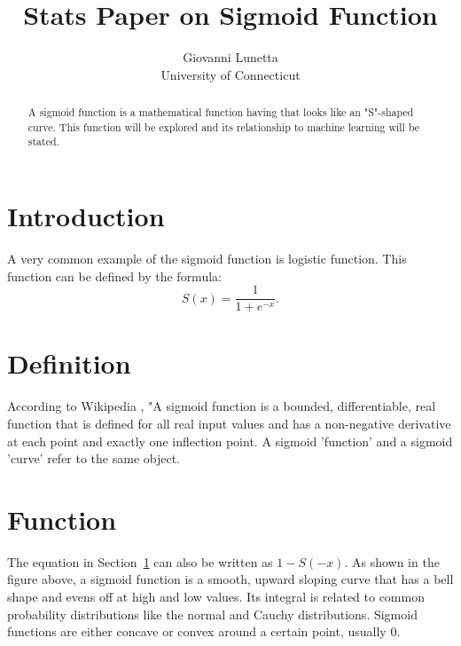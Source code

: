 \documentclass[12pt]{article}
\title{Stats Paper on Sigmoid Function}
\author{Giovanni Lunetta\\
  University of Connecticut}
\begin{document}
\maketitle

\begin{abstract}
A sigmoid function is a mathematical function having that looks like an 
"S"-shaped curve. This function will be explored and its relationship to 
machine learning will be stated.
\end{abstract}


\section{Introduction}
\label{sec:intro}
A very common example of the sigmoid function is logistic function. 
This function can be defined by the formula:
\begin{equation}
  \label{eq:sigmoideq}
  S(x) =  \frac{1}{1 +{e^{-x}}}.
\end{equation}

\section{Definition}
\label{sec:def}
According to Wikipedia \citep{wikipedia_2022}, "A sigmoid function is a bounded, differentiable, 
real function that is defined for all real input values and has a non-negative 
derivative at each point and exactly one inflection point. A sigmoid 'function' 
and a sigmoid 'curve' refer to the same object. 
  
\section{Function}
\label{sec:function}
The equation in Section~\ref{sec:intro} can also be written as $1 - S(-x).$
As shown in the figure above, a sigmoid function is a smooth, upward sloping 
curve that has a bell shape and evens off at high and low values. Its integral is 
related to common probability distributions like the normal and Cauchy 
distributions. Sigmoid functions are either concave or convex around a certain 
point, usually 0.
\end{document}
